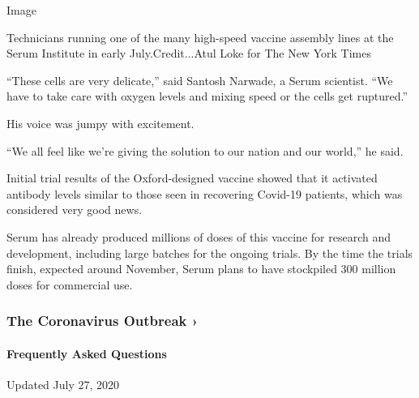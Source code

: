 Image

Technicians running one of the many high-speed vaccine assembly lines at
the Serum Institute in early July.Credit...Atul Loke for The New York
Times

``These cells are very delicate,'' said Santosh Narwade, a Serum
scientist. ``We have to take care with oxygen levels and mixing speed or
the cells get ruptured.''

His voice was jumpy with excitement.

``We all feel like we're giving the solution to our nation and our
world,'' he said.

Initial trial results of the Oxford-designed vaccine showed that it
activated antibody levels similar to those seen in recovering Covid-19
patients, which was considered very good news.

Serum has already produced millions of doses of this vaccine for
research and development, including large batches for the ongoing
trials. By the time the trials finish, expected around November, Serum
plans to have stockpiled 300 million doses for commercial use.

\href{https://www.nytimes3xbfgragh.onion/news-event/coronavirus?action=click\&pgtype=Article\&state=default\&region=MAIN_CONTENT_3\&context=storylines_faq}{}

\hypertarget{the-coronavirus-outbreak-}{%
\subsubsection{The Coronavirus Outbreak
›}\label{the-coronavirus-outbreak-}}

\hypertarget{frequently-asked-questions}{%
\paragraph{Frequently Asked
Questions}\label{frequently-asked-questions}}

Updated July 27, 2020

